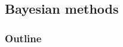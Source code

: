 \documentclass[color=usenames,dvipsnames]{beamer}\usepackage[]{graphicx}\usepackage[]{xcolor}
\begin{document}









\subsection{Bayesian methods}



\begin{frame}
  \frametitle{Outline}
  \Large
\end{frame}
\end{document}
